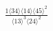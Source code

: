 \documentclass[varwidth, border=5pt]{standalone}
\begin{document}
\begin{my}
$\begin{gathered}
\scriptscriptstyle\frac{1⟨34⟩⟨14⟩⟨45⟩^2}{⟨13⟩^3⟨24⟩^2}
\end{gathered}$
\end{my}
\end{document}
